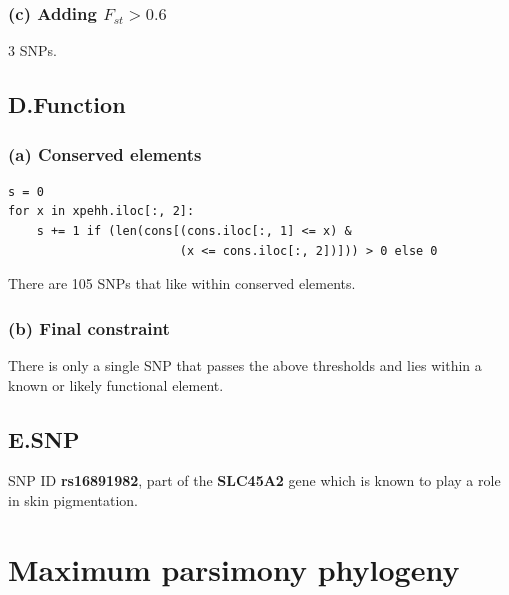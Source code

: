 \documentclass{article}[11pt]
\begin{document}
\subsubsection*{(c) Adding $F_{st} > 0.6$}
3 SNPs.

\subsection*{D.\quad Function}
\subsubsection*{(a) Conserved elements}
\begin{verbatim}
s = 0
for x in xpehh.iloc[:, 2]:
    s += 1 if (len(cons[(cons.iloc[:, 1] <= x) &
                        (x <= cons.iloc[:, 2])])) > 0 else 0
\end{verbatim}

\noindent There are 105 SNPs that like within conserved elements.

\subsubsection*{(b) Final constraint}
There is only a single SNP that passes the above thresholds and lies within
a known or likely functional element.

\subsection*{E.\quad SNP}
SNP ID {\bf rs16891982}, part of the {\bf SLC45A2} gene which
is known to play a role in skin pigmentation.



\section{Maximum parsimony phylogeny}
\end{document}
